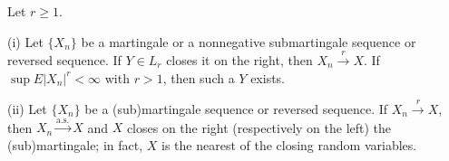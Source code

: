 Let $r \geq 1$.

(i) Let $\{X_n\}$ be a martingale or a nonnegative submartingale sequence or reversed sequence. If $Y \in L_r$ closes it on the right, then $X_n \xrightarrow{r} X$. If $\sup E|X_n|^r < \infty$ with $r > 1$, then such a $Y$ exists.

(ii) Let $\{X_n\}$ be a (sub)martingale sequence or reversed sequence. If $X_n \xrightarrow{r} X$, then $X_n \xrightarrow{\text{a.s.}} X$ and $X$ closes on the right (respectively on the left) the (sub)martingale; in fact, $X$ is the nearest of the closing random variables.
